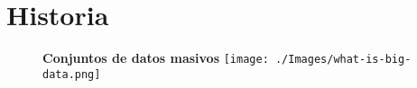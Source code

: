
\section{Historia}

	\begin{frame}{}
		\kern-0.5cm
		\begin{figure}
			\centering
			\textbf{Conjuntos de datos masivos}
			\texttt{[image: ./Images/what-is-big-data.png]}
		\end{figure}
    \end{frame}
